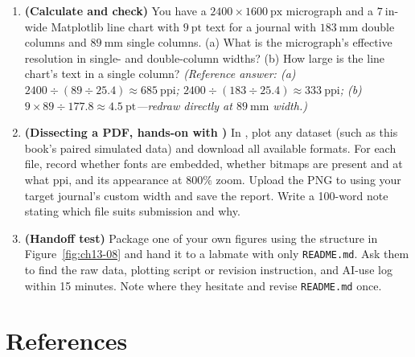 \begin{enumerate}
\item \textbf{(Calculate and check)} You have a $2400 \times 1600\ \text{px}$ micrograph and a $7\ \text{in}$-wide Matplotlib line chart with $9\ \text{pt}$ text for a journal with $183\ \text{mm}$ double columns and $89\ \text{mm}$ single columns. (a) What is the micrograph's effective resolution in single- and double-column widths? (b) How large is the line chart's text in a single column? \textit{(Reference answer: (a) $2400 \div (89 \div 25.4) \approx 685\ \text{ppi}$; $2400 \div (183 \div 25.4) \approx 333\ \text{ppi}$; (b) $9 \times 89 \div 177.8 \approx 4.5\ \text{pt}$---redraw directly at $89\ \text{mm}$ width.)}
\item \textbf{(Dissecting a PDF, hands-on with \scidraw{})} In , plot any dataset (such as this book's paired simulated data) and download all available formats. For each file, record whether fonts are embedded, whether bitmaps are present and at what ppi, and its appearance at $800\%$ zoom. Upload the PNG to  using your target journal's custom width and save the report. Write a 100-word note stating which file suits submission and why.
\item \textbf{(Handoff test)} Package one of your own figures using the structure in Figure~\ref{fig:ch13-08} and hand it to a labmate with only \texttt{README.md}. Ask them to find the raw data, plotting script or \scidraw{} revision instruction, and AI-use log within 15 minutes. Note where they hesitate and revise \texttt{README.md} once.
\end{enumerate}

\section*{References}


